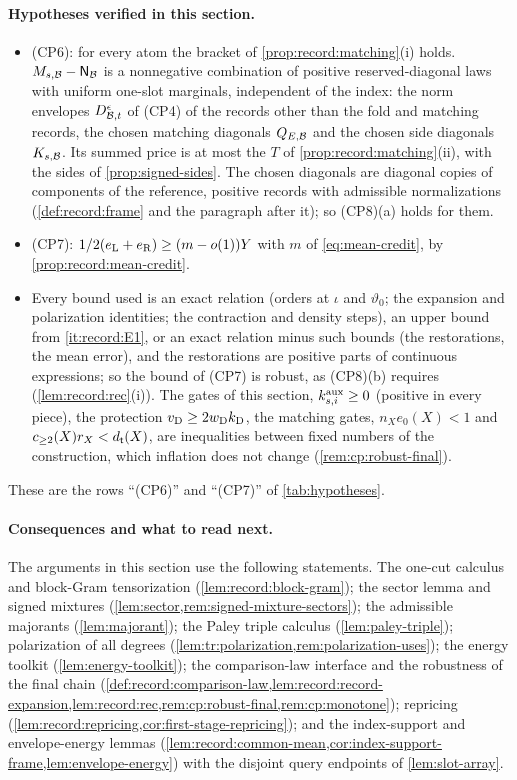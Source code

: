 \paragraph{Hypotheses verified in this section.}
\begin{itemize}
\item (CP6): for every atom the bracket of \cref{prop:record:matching}(i) holds.
 $M_{s,\Blk}-\Nbr_\Blk$ is a nonnegative combination of positive reserved-diagonal
 laws with uniform one-slot marginals, independent of the index: the norm
 envelopes $D^\epsilon_{\Blk,t}$ of (CP4) of the records other than the fold and
 matching records, the chosen matching diagonals $Q_{E,\Blk}$ and the chosen side
 diagonals $K_{s,\Blk}$. Its summed price is at most the $T$ of
 \cref{prop:record:matching}(ii), with the sides of \cref{prop:signed-sides}. The
 chosen diagonals are diagonal copies of components of the reference, positive
 records with admissible normalizations (\cref{def:record:frame} and the paragraph
 after it); so (CP8)(a) holds for them.
\item (CP7): $\frac12(e_{\rm L}+e_{\rm R})\ge(m-o(1))Y$ with $m$ of
 \eqref{eq:mean-credit}, by \cref{prop:record:mean-credit}.
\item Every bound used is an exact relation (orders at $\iota$ and $\vartheta_0$;
 the expansion and polarization identities; the contraction and density
 steps), an upper bound from \ref{it:record:E1}, or an exact relation minus such
 bounds (the restorations, the mean error), and the restorations are positive
 parts of continuous expressions; so the bound of (CP7) is robust, as (CP8)(b)
 requires (\cref{lem:record:rec}(i)). The gates of this section, $k^{\rm aux}_{s,i}\ge0$
 (positive in every piece), the protection $v_{\rm D}\ge2w_{\rm D}k_{\rm D}$, the
 matching gates, $n_Xe_0(X)<1$ and $c_{\ge2}(X)r_X<d_\tlaw(X)$, are inequalities
 between fixed numbers of the construction, which inflation does not change
 (\cref{rem:cp:robust-final}).
\end{itemize}
These are the rows ``(CP6)'' and ``(CP7)'' of \cref{tab:hypotheses}.

\paragraph{Consequences and what to read next.}
The arguments in this section use the following statements. The one-cut calculus and block-Gram tensorization
(\cref{lem:record:block-gram}); the sector lemma and signed mixtures
(\cref{lem:sector,rem:signed-mixture-sectors}); the admissible majorants
(\cref{lem:majorant}); the Paley triple calculus (\cref{lem:paley-triple});
polarization of all degrees
(\cref{lem:tr:polarization,rem:polarization-uses}); the energy toolkit
(\cref{lem:energy-toolkit}); the comparison-law interface and the robustness of
the final chain
(\cref{def:record:comparison-law,lem:record:record-expansion,lem:record:rec,rem:cp:robust-final,rem:cp:monotone});
repricing (\cref{lem:record:repricing,cor:first-stage-repricing}); and the
index-support and envelope-energy lemmas
(\cref{lem:record:common-mean,cor:index-support-frame,lem:envelope-energy}) with the
disjoint query endpoints of \cref{lem:slot-array}.

